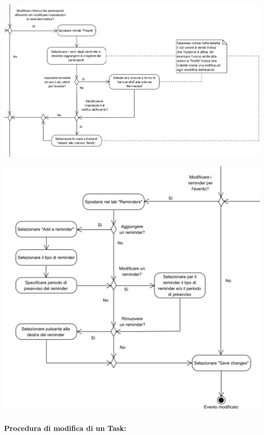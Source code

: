 \begin{center}
	\includegraphics[width=15cm]{./DiagrammiProcedure/EditEventi3.png}
\end{center}

\begin{center}
	\includegraphics[width=15cm]{./DiagrammiProcedure/EditEventi4.png}
\end{center}

\newpage
\paragraph{Procedura di modifica di un Task:}

